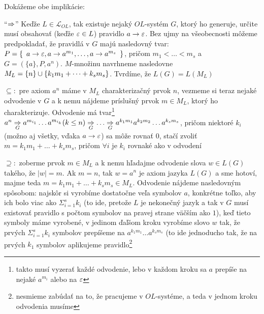 \begin{dokaz}
  Dokážeme obe implikácie:
  \begin{description}
    \item{``$\Rightarrow$''} Keďže $L\in\mathcal{L}_{OL}$, tak existuje nejaký
      $OL$-systém $G$, ktorý ho generuje, určite musí obsahovať (keďže
      $\varepsilon\in L$) pravidlo $a\rightarrow\varepsilon$. Bez ujmy na
      všeobecnosti môžeme predpokladať, že pravidlá v $G$ majú
      nasledovný tvar: $P=\{\enspace a\rightarrow\varepsilon,a\rightarrow
      a^{m_{1}},\dots,a\rightarrow a^{m_{s}}\enspace\}$, pričom $m_{1}<\dots<m_{s}$
      a $G=(\{a\},P,a^{n})$. $M$-množinu navrhneme nasledovne
      $M_{L}=\{n\}\cup\{k_{1}m_{1}+\dots+k_{s}m_{s}\}$. Tvrdíme, že
      $L(G)=L(M_{L})$
      \begin{description}
        \item{$\subseteq:$} pre axiom $a^{n}$ máme v $M_{L}$
          charakterizačný prvok $n$, vezmeme si teraz nejaké odvodenie v $G$
          a k nemu nájdeme príslušný prvok $m\in M_{L}$, ktorý ho
          charakterizuje. Odvodenie má tvar\footnote{takto musí vyzerať
          každé odvodenie, lebo v každom kroku sa $a$ prepíše na nejaké
          $a^{m_{i}}$ alebo na $\varepsilon$} $a^{n}\underset{G}{\Rightarrow}
          a^{m_{i_{1}}}\dots a^{m_{i_{k}}}(k\leq
          n)\underset{G}{\Rightarrow}\dots\underset{G}{\Rightarrow}
          a^{k_{1}m_{1}}a^{k_{2}m_{2}}\dots a^{k_{s}m_{s}}$, pričom niektoré
          $k_{i}$ (možno aj všetky, vďaka $a\rightarrow\varepsilon$) sa môže rovnať
          $0$, stačí zvoliť $m=k_{1}m_{1}+\dots+k_{s}m_{s}$, pričom $\forall
          i$ je $k_{i}$ rovnaké ako v odvodení
        \item{$\supseteq:$} zoberme prvok $m\in M_{L}$ a k nemu hľadajme
          odvodenie slova $w\in L(G)$ takého, že $|w|=m$. Ak $m=n$, tak
          $w=a^{n}$ je axiom jazyka $L(G)$ a sme hotoví, majme teda
          $m=k_{1}m_{1}+\dots+k_{s}m_{s}\in M_{L}$. Odvodenie nájdeme
          nasledovným spôsobom: najskôr si vyrobíme dostatočne veľa symbolov
          $a$, konkrétne  toľko, aby ich bolo viac ako
          $\Sigma_{i=1}^{s}k_{i}$ (to ide, pretože $L$ je nekonečný jazyk a
          tak v $G$ musí existovať pravidlo s počtom symbolov na pravej
          strane väčším ako $1$), keď tieto symboly máme vyrobené, v jedinom
          ďaľšom kroku vyrobíme slovo $w$ tak, že prvých
          $\Sigma_{i=1}^{s}k_{i}$ symbolov prepíšeme na $a^{k_{1}m_{1}}\dots
          a^{k_{s}m_{s}}$ (to ide jednoducho tak, že na prvých $k_{1}$
          symbolov aplikujeme pravidlo\footnote{nesmieme zabúdať na to, že
          pracujeme v $OL$-systéme, a teda v jednom kroku odvodenia musíme
}
\end{description}
\end{description}
\end{dokaz}
